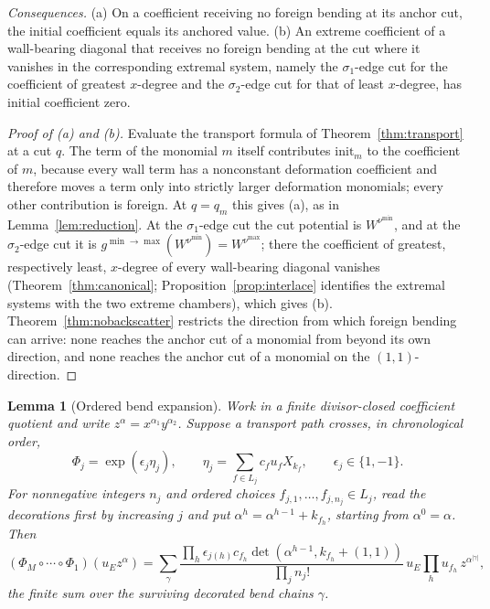 \documentclass[11pt]{amsart}
\newtheorem{lemma}[theorem]{Lemma}
\theoremstyle{definition}
\theoremstyle{remark}
\begin{document}
\emph{Consequences.}  (a) On a coefficient receiving no foreign bending at its
anchor cut, the initial coefficient equals its anchored value.  (b) An extreme
coefficient of a wall-bearing diagonal that receives no foreign bending at the
cut where it vanishes in the corresponding extremal system, namely the
$\sigma_1$-edge cut for the coefficient of greatest $x$-degree and the
$\sigma_2$-edge cut for that of least $x$-degree, has initial coefficient
zero.

\begin{proof}[Proof of (a) and (b)]
Evaluate the transport formula of Theorem~\ref{thm:transport} at a cut $q$.
The term of the monomial $m$ itself contributes $\mathrm{init}_m$ to the
coefficient of $m$, because every wall term has a nonconstant deformation
coefficient and therefore moves a term only into strictly larger deformation
monomials; every other contribution is foreign.  At $q=q_m$ this gives (a), as
in Lemma~\ref{lem:reduction}.  At the $\sigma_1$-edge cut the cut potential is
$W^{\nu^{\min}}$, and at the $\sigma_2$-edge cut it is
$g^{\min\to\max}(W^{\nu^{\min}})=W^{\nu^{\max}}$; there the coefficient of
greatest, respectively least, $x$-degree of every wall-bearing diagonal
vanishes (Theorem~\ref{thm:canonical}; Proposition~\ref{prop:interlace}
identifies the extremal systems with the two extreme chambers), which gives
(b).  Theorem~\ref{thm:nobackscatter} restricts the direction from which foreign
bending can arrive: none reaches the anchor cut of a monomial from beyond its
own direction, and none reaches the anchor cut of a monomial on the
$(1,1)$-direction.
\end{proof}

\begin{lemma}[Ordered bend expansion]
\label{lem:bendchain}
Work in a finite divisor-closed coefficient quotient and write
$z^\alpha=x^{\alpha_1}y^{\alpha_2}$.  Suppose a transport path crosses, in chronological
order,
\[
 \Phi_j=\exp(\!\epsilon_j\eta_j),\qquad
 \eta_j=\sum_{f\in L_j}c_f u_f X_{k_f},
 \qquad \epsilon_j\in\{1,-1\}.
\]
For nonnegative integers $n_j$ and ordered choices
$f_{j,1},\ldots,f_{j,n_j}\in L_j$, read the decorations first by
increasing $j$ and put $\alpha^h=\alpha^{h-1}+k_{f_h}$, starting from $\alpha^0=\alpha$.
Then
\begin{equation}
\label{eq:bendchain}
 (\Phi_M\circ\cdots\circ\Phi_1)(u_Ez^\alpha)
 =\sum_\gamma
 \frac{\prod_h\epsilon_{j(h)}c_{f_h}
  \det(\alpha^{h-1},k_{f_h}+(1,1))}
 {\prod_j n_j!}\,
 u_E\prod_hu_{f_h}\,z^{\alpha^{|\gamma|}},
\end{equation}
the finite sum over the surviving decorated bend chains $\gamma$.
\end{lemma}
\end{document}
